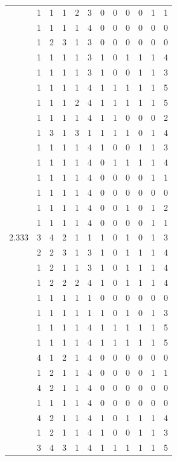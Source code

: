 \documentclass[]{book}
\theoremstyle{definition}
\theoremstyle{definition}
\theoremstyle{definition}
\theoremstyle{remark}
\begin{document}
\begin{table}
{\begin{tabular}[t]{rrrrrrrrrrrr}
 & 1 & 1 & 1 & 2 & 3 & 0 & 0 & 0 & 0 & 1 & 1\\
 & 1 & 1 & 1 & 1 & 4 & 0 & 0 & 0 & 0 & 0 & 0\\
 & 1 & 2 & 3 & 1 & 3 & 0 & 0 & 0 & 0 & 0 & 0\\
 & 1 & 1 & 1 & 1 & 3 & 1 & 0 & 1 & 1 & 1 & 4\\
 & 1 & 1 & 1 & 1 & 3 & 1 & 0 & 0 & 1 & 1 & 3\\
 & 1 & 1 & 1 & 1 & 4 & 1 & 1 & 1 & 1 & 1 & 5\\
 & 1 & 1 & 1 & 2 & 4 & 1 & 1 & 1 & 1 & 1 & 5\\
 & 1 & 1 & 1 & 1 & 4 & 1 & 1 & 0 & 0 & 0 & 2\\
 & 1 & 3 & 1 & 3 & 1 & 1 & 1 & 1 & 0 & 1 & 4\\
 & 1 & 1 & 1 & 1 & 4 & 1 & 0 & 0 & 1 & 1 & 3\\
 & 1 & 1 & 1 & 1 & 4 & 0 & 1 & 1 & 1 & 1 & 4\\
 & 1 & 1 & 1 & 1 & 4 & 0 & 0 & 0 & 0 & 1 & 1\\
 & 1 & 1 & 1 & 1 & 4 & 0 & 0 & 0 & 0 & 0 & 0\\
 & 1 & 1 & 1 & 1 & 4 & 0 & 0 & 1 & 0 & 1 & 2\\
 & 1 & 1 & 1 & 1 & 4 & 0 & 0 & 0 & 0 & 1 & 1\\
2.333 & 3 & 4 & 2 & 1 & 1 & 1 & 0 & 1 & 0 & 1 & 3\\
 & 2 & 2 & 3 & 1 & 3 & 1 & 0 & 1 & 1 & 1 & 4\\
 & 1 & 2 & 1 & 1 & 3 & 1 & 0 & 1 & 1 & 1 & 4\\
 & 1 & 2 & 2 & 2 & 4 & 1 & 0 & 1 & 1 & 1 & 4\\
 & 1 & 1 & 1 & 1 & 1 & 0 & 0 & 0 & 0 & 0 & 0\\
 & 1 & 1 & 1 & 1 & 1 & 1 & 0 & 1 & 0 & 1 & 3\\
 & 1 & 1 & 1 & 1 & 4 & 1 & 1 & 1 & 1 & 1 & 5\\
 & 1 & 1 & 1 & 1 & 4 & 1 & 1 & 1 & 1 & 1 & 5\\
 & 4 & 1 & 2 & 1 & 4 & 0 & 0 & 0 & 0 & 0 & 0\\
 & 1 & 2 & 1 & 1 & 4 & 0 & 0 & 0 & 0 & 1 & 1\\
 & 4 & 2 & 1 & 1 & 4 & 0 & 0 & 0 & 0 & 0 & 0\\
 & 1 & 1 & 1 & 1 & 4 & 0 & 0 & 0 & 0 & 0 & 0\\
 & 4 & 2 & 1 & 1 & 4 & 1 & 0 & 1 & 1 & 1 & 4\\
 & 1 & 2 & 1 & 1 & 4 & 1 & 0 & 0 & 1 & 1 & 3\\
 & 3 & 4 & 3 & 1 & 4 & 1 & 1 & 1 & 1 & 1 & 5\\

\end{tabular}}
\end{table}
\end{document}
